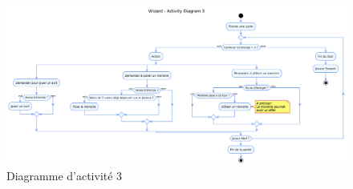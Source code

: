 \documentclass[11pt,a4paper]{article}
\begin{document}
\begin{figure}[ht]
  \centering
  \includegraphics[width=1\textwidth]{../uml_files/ActivityDiagram3.png}
  \caption{\label{fig:act3} Diagramme d'activité 3}
\end{figure}

\clearpage
\printindex
\end{document}
